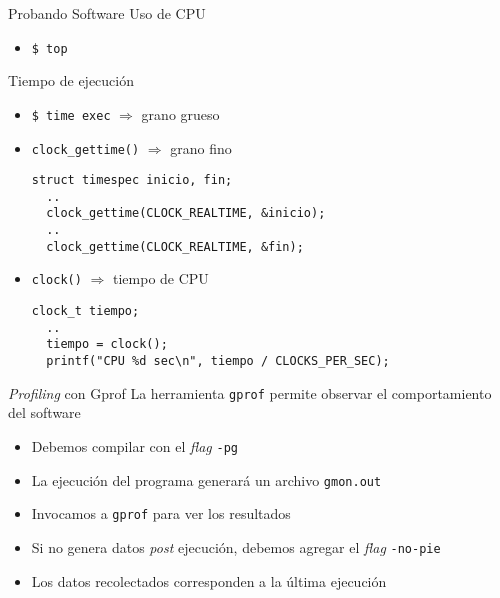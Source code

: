 \begin{frame}[fragile]{Probando Software}
    Uso de CPU
    \begin{itemize}
        \item \verb|$ top|
    \end{itemize}
    Tiempo de ejecución
    \begin{itemize}
        \item \verb|$ time exec| $\Rightarrow$ grano grueso
        \item \verb|clock_gettime()| $\Rightarrow$ grano fino
        \begin{lstlisting}[style=consola]
  struct timespec inicio, fin;
  ..
  clock_gettime(CLOCK_REALTIME, &inicio);
  ..
  clock_gettime(CLOCK_REALTIME, &fin);
        \end{lstlisting}
        \item \verb|clock()| $\Rightarrow$ tiempo de CPU
        \begin{lstlisting}[style=consola]
  clock_t tiempo;
  ..
  tiempo = clock();
  printf("CPU %d sec\n", tiempo / CLOCKS_PER_SEC);
        \end{lstlisting}
    \end{itemize}
\end{frame}


\begin{frame}[fragile]{\emph{Profiling} con Gprof}
    La herramienta \verb|gprof| permite observar el comportamiento del software
    \begin{itemize}
        \item Debemos compilar con el \emph{flag} \verb|-pg|
        \item La ejecución del programa generará un archivo \verb|gmon.out|
        \item Invocamos a \verb|gprof| para ver los resultados
        \item Si no genera datos \emph{post} ejecución, debemos agregar el \emph{flag} \verb|-no-pie|
        \item Los datos recolectados corresponden a la última ejecución
    \end{itemize}
\end{frame}

